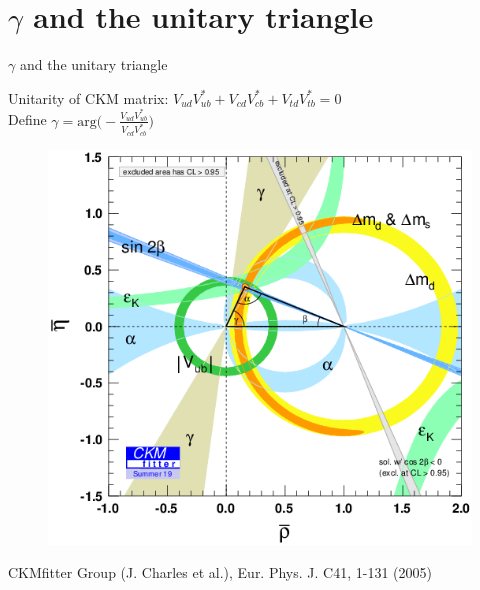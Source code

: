\documentclass{beamer}
\begin{document}
\section{\texorpdfstring{$\gamma$}{gamma} and the unitary triangle}
\begin{frame}{$\gamma$ and the unitary triangle}
  \begin{center}
    Unitarity of CKM matrix: $V_{ud}V^*_{ub} + V_{cd}V^*_{cb} + V_{td}V^*_{tb} = 0$ \\
    \vspace{0.4cm}
    Define $\gamma = \text{arg}\Big(-\frac{V_{ud}V^*_{ub}}{V_{cd}V^*_{cb}}\Big)$
  \end{center}
  \vspace{-0.2cm}
  \begin{figure}
    \includegraphics[scale = 0.3]{ckmfitter.png}
  \end{figure}
  \vspace{-0.4cm}
  \begin{center}
    CKMfitter Group (J. Charles et al.), Eur. Phys. J. C41, 1-131 (2005)
  \end{center}
\end{frame}
\end{document}
